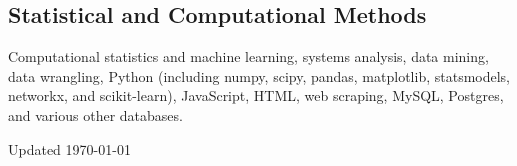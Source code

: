 \documentclass[12pt,letterpaper]{report}
\newcommand{\listitemspace}{0.15em}
\renewenvironment{itemize}
{\begin{list}{}{\setlength{\leftmargin}{0em}
            \setlength{\parskip}{0em}
            \setlength{\itemsep}{\listitemspace}
            \setlength{\parsep}{\listitemspace}}}
    {\end{list}}
\begin{document}
    \subsection*{Statistical and Computational Methods}

    \begin{itemize}

        \item Computational statistics and machine learning, systems analysis, data mining, data wrangling, Python (including numpy, scipy, pandas, matplotlib, statsmodels, networkx, and scikit-learn), JavaScript, HTML, web scraping, MySQL, Postgres, and various other databases.

    \end{itemize}



    \begin{center}
        \vfill
        Updated \monthyeardate\today
    \end{center}
\end{document}

